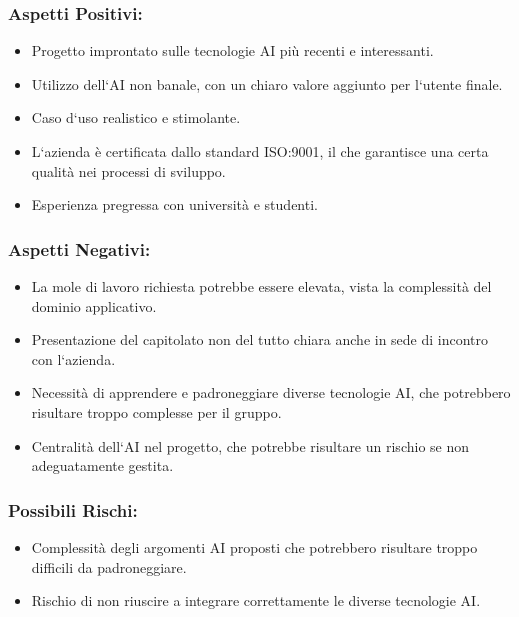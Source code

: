 \documentclass[a4paper,12pt]{article}
\begin{document}
\subsubsection*{Aspetti Positivi:}
\begin{itemize}
    \item Progetto improntato sulle tecnologie AI più recenti e interessanti.
    \item Utilizzo dell`AI non banale, con un chiaro valore aggiunto per l`utente finale.
    \item Caso d`uso realistico e stimolante.
    \item L`azienda è certificata dallo standard ISO:9001, il che garantisce una certa
          qualità nei processi di sviluppo.
    \item Esperienza pregressa con università e studenti.
\end{itemize}

\subsubsection*{Aspetti Negativi:}
\begin{itemize}
    \item La mole di lavoro richiesta potrebbe essere elevata, vista la complessità del
          dominio applicativo.
    \item Presentazione del capitolato non del tutto chiara anche in sede di incontro con
          l`azienda.
    \item Necessità di apprendere e padroneggiare diverse tecnologie AI, che potrebbero
          risultare troppo complesse per il gruppo.
    \item Centralità dell`AI nel progetto, che potrebbe risultare un rischio se non
          adeguatamente gestita.
\end{itemize}

\subsubsection*{Possibili Rischi:}
\begin{itemize}
    \item Complessità degli argomenti AI proposti che potrebbero risultare troppo
          difficili da padroneggiare.
    \item Rischio di non riuscire a integrare correttamente le diverse tecnologie AI.
\end{itemize}
\end{document}
